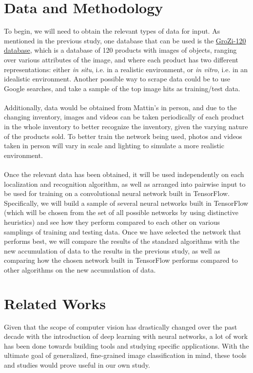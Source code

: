\documentclass{article}
\begin{document}
\section{Data and Methodology}
To begin, we will need to obtain the relevant types of data for input. As mentioned in the previous study, one database that can be used is the \href{http://grozi.calit2.net/grozi.html}{GroZi-120 database}, which is a database of 120 products with images of objects, ranging over various attributes of the image, and where each product has two different representations: either \textit{in situ}, i.e. in a realistic environment, or \textit{in vitro}, i.e. in an idealistic environment. Another possible way to scrape data could be to use Google searches, and take a sample of the top image hits as training/test data.
\\ \\
Additionally, data would be obtained from Mattin's in person, and due to the changing inventory, images and videos can be taken periodically of each product in the whole inventory to better recognize the inventory, given the varying nature of the products sold. To better train the network being used, photos and videos taken in person will vary in scale and lighting to simulate a more realistic environment.
\\ \\
Once the relevant data has been obtained, it will be used independently on each localization and recognition algorithm, as well as arranged into pairwise input to be used for training on a convolutional neural network built in TensorFlow. Specifically, we will build a sample of several neural networks built in TensorFlow (which will be chosen from the set of all possible networks by using distinctive heuristics) and see how they perform compared to each other on various samplings of training and testing data. Once we have selected the network that performs best, we will compare the results of the standard algorithms with the new accumulation of data to the results in the previous study, as well as comparing how the chosen network built in TensorFlow performs compared to other algorithms on the new accumulation of data.
\section{Related Works}
Given that the scope of computer vision has drastically changed over the past decade with the introduction of deep learning with neural networks, a lot of work has been done towards building tools and studying specific applications. With the ultimate goal of generalized, fine-grained image classification in mind, these tools and studies would prove useful in our own study.
\end{document}

